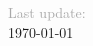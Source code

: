 \documentclass[a4paper%
]{fortysecondscv}
\begin{document}
 \makefrontsidebar \newpage \null  %

% 

% 
% 

\vfill 


\textcolor{darkgray}{%
    Last update:
    } \\
\today
\end{document}
